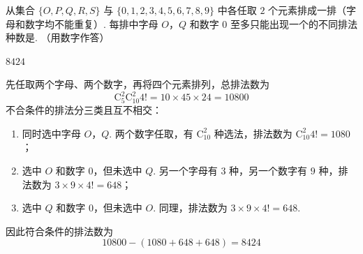 \begin{problem}
从集合 \(\{O, P, Q, R, S\}\) 与 \(\{0, 1, 2, 3, 4, 5, 6, 7, 8, 9\}\) 中各任取 \(2\) 个元素排成一排（字母和数字均不能重复）. 每排中字母 \(O\)，\(Q\) 和数字 \(0\) 至多只能出现一个的不同排法种数是\fillinblank{}. （用数字作答）

\begin{answer}
\(8424\)
\end{answer}

\begin{solution}
先任取两个字母、两个数字，再将四个元素排列，总排法数为
\[
\mathrm C_5^2\mathrm C_{10}^2 4!=10\times45\times24=10800
\]
不合条件的排法分三类且互不相交：
\begin{enumerate}
\item 同时选中字母 \(O\)，\(Q\). 两个数字任取，有 \(\mathrm C_{10}^2\) 种选法，排法数为 \(\mathrm C_{10}^2 4!=1080\)；
\item 选中 \(O\) 和数字 \(0\)，但未选中 \(Q\). 另一个字母有 \(3\) 种，另一个数字有 \(9\) 种，排法数为 \(3\times9\times4!=648\)；
\item 选中 \(Q\) 和数字 \(0\)，但未选中 \(O\). 同理，排法数为 \(3\times9\times4!=648\).
\end{enumerate}
因此符合条件的排法数为
\[
10800-(1080+648+648)=8424
\]
\end{solution}
\end{problem}

